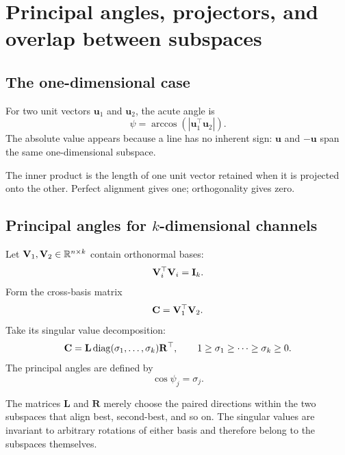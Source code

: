 \chapter{Principal angles, projectors, and overlap between subspaces}

\section{The one-dimensional case}

For two unit vectors \(\mathbf u_1\) and \(\mathbf u_2\), the acute angle is
\begin{equation}
\psi=\arccos\left(|\mathbf u_1^\top\mathbf u_2|\right).
\end{equation}
The absolute value appears because a line has no inherent sign: \(\mathbf u\) and \(-\mathbf u\) span the same one-dimensional subspace.

\inwords The inner product is the length of one unit vector retained when it is projected onto the other. Perfect alignment gives one; orthogonality gives zero.

\section{Principal angles for \(k\)-dimensional channels}

Let \(\mathbf{V}_1,\mathbf{V}_2\in\mathbb R^{n\times k}\) contain orthonormal bases:
\begin{equation}
\mathbf{V}_i^\top\mathbf{V}_i=\mathbf{I}_k.
\end{equation}
Form the cross-basis matrix
\begin{equation}
\mathbf C=\mathbf{V}_1^\top\mathbf{V}_2.
\end{equation}
Take its singular value decomposition:
\begin{equation}
\mathbf C=\mathbf L\operatorname{diag}(\sigma_1,\ldots,\sigma_k)\mathbf R^\top,
\qquad
1\ge\sigma_1\ge\cdots\ge\sigma_k\ge0.
\end{equation}
The principal angles are defined by
\begin{equation}
\boxed{\cos\psi_j=\sigma_j.}
\label{eq:principalAngles}
\end{equation}

\begin{mathteach}
The matrices \(\mathbf L\) and \(\mathbf R\) merely choose the paired directions within the two subspaces that align best, second-best, and so on. The singular values are invariant to arbitrary rotations of either basis and therefore belong to the subspaces themselves.
\end{mathteach}

